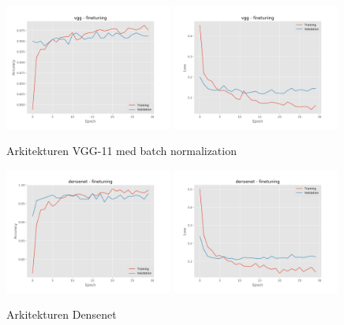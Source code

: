 \documentclass{kththesis}
\begin{document}
    \begin{figure}
      \centering
      \includegraphics[width=0.49\textwidth]{"./balcony/balcony-20split - acc - vgg - finetuning"}
      \includegraphics[width=0.49\textwidth]{"./balcony/balcony-20split - loss - vgg - finetuning"}
      \caption{Arkitekturen VGG-11 med batch normalization}
    \end{figure}

    \begin{figure}
      \centering
      \includegraphics[width=0.49\textwidth]{"./balcony/balcony-20split - acc - densenet - finetuning"}
      \includegraphics[width=0.49\textwidth]{"./balcony/balcony-20split - loss - densenet - finetuning"}
      \caption{Arkitekturen Densenet}
    \end{figure}
\end{document}
